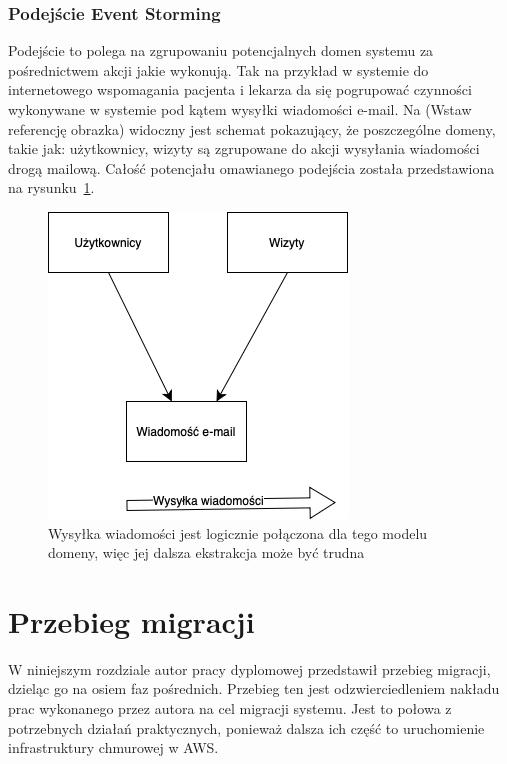 \documentclass[12pt,oneside]{book}
\newcommand{\captionvspace}{\vspace{6pt}}
\begin{document}
    \subsection{Podejście Event Storming}
    Podejście to polega na zgrupowaniu potencjalnych domen systemu za pośrednictwem akcji jakie wykonują. Tak na przykład w systemie do internetowego wspomagania pacjenta i lekarza da się pogrupować czynności wykonywane w systemie pod kątem wysyłki wiadomości e-mail. Na (Wstaw referencję obrazka) widoczny jest schemat pokazujący, że poszczególne domeny, takie jak: użytkownicy, wizyty są zgrupowane do akcji wysyłania wiadomości drogą mailową. Całość potencjału omawianego podejścia została przedstawiona na rysunku~\ref{fig:event-storming-approach}.

    \begin{figure}[ht]
        \centering
        \includegraphics[width=\textwidth]{includes/images/event-storming-approach.png}
        \captionvspace
        \caption{Wysyłka wiadomości jest logicznie połączona dla tego modelu domeny, więc jej dalsza ekstrakcja może być trudna}
        \label{fig:event-storming-approach}
    \end{figure}


    \chapter{Przebieg migracji}
    W niniejszym rozdziale autor pracy dyplomowej przedstawił przebieg migracji, dzieląc go na osiem faz pośrednich. Przebieg ten jest odzwierciedleniem nakładu prac wykonanego przez autora na cel migracji systemu. Jest to połowa z potrzebnych działań praktycznych, ponieważ dalsza ich część to uruchomienie infrastruktury chmurowej w AWS.
\end{document}
